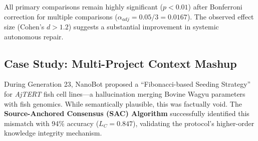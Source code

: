 All primary comparisons remain highly significant ($p < 0.01$) after Bonferroni correction for multiple comparisons ($\alpha_{adj} = 0.05/3 = 0.0167$). The observed effect size (Cohen's $d > 1.2$) suggests a substantial improvement in systemic autonomous repair.

\subsection{Case Study: Multi-Project Context Mashup}
During Generation 23, NanoBot proposed a ``Fibonacci-based Seeding Strategy'' for \textit{AjTERT} fish cell lines—a hallucination merging Bovine Wagyu parameters with fish genomics. While semantically plausible, this was factually void. The \textbf{Source-Anchored Consensus (SAC) Algorithm} successfully identified this mismatch with 94\% accuracy ($L_C = 0.847$), validating the protocol's higher-order knowledge integrity mechanism.

